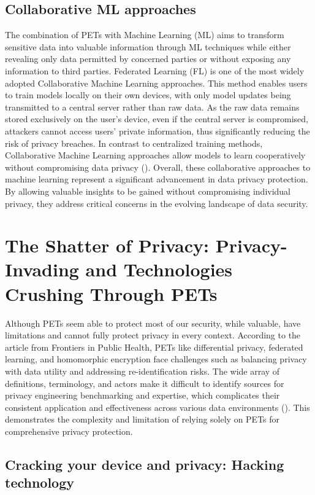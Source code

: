 \documentclass[a4paper,12pt]{article}
\newcommand{\sectionpage}[1]{
  \newpage
  \section{#1}
  \doublespacing
  \singlespacing
}
\begin{document}
 
\subsection{Collaborative ML approaches}

The combination of PETs with Machine Learning (ML) aims to transform sensitive data into valuable information through ML techniques while either revealing only data permitted by concerned parties or without exposing any information to third parties. Federated Learning (FL) is one of the most widely adopted Collaborative Machine Learning approaches. This method enables users to train models locally on their own devices, with only model updates being transmitted to a central server rather than raw data. As the raw data remains stored exclusively on the user's device, even if the central server is compromised, attackers cannot access users' private information, thus significantly reducing the risk of privacy breaches. In contrast to centralized training methods, Collaborative Machine Learning approaches allow models to learn cooperatively without compromising data privacy (\cite{soykan2022collaborative_ml}). Overall, these collaborative approaches to machine learning represent a significant advancement in data privacy protection. By allowing valuable insights to be gained without compromising individual privacy, they address critical concerns in the evolving landscape of data security.

\sectionpage{The Shatter of Privacy: Privacy-Invading and Technologies
Crushing Through PETs}
\onehalfspacing
Although PETs seem able to protect most of our security, while valuable, have limitations and cannot fully protect privacy in every context. According to the article from Frontiers in Public Health, PETs like differential privacy, federated learning, and homomorphic encryption face challenges such as balancing privacy with data utility and addressing re-identification risks. The wide array of definitions, terminology, and actors make it difficult to identify sources for privacy engineering benchmarking and expertise, which complicates their consistent application and effectiveness across various data environments (\cite{jordan2022privacy}). This demonstrates the complexity and limitation of relying solely on PETs for comprehensive privacy protection.

\subsection{Cracking your device and privacy: Hacking technology}
\end{document}
